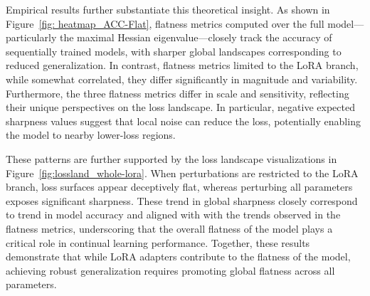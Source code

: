 \documentclass[letterpaper]{article} %
\begin{document}
Empirical results further substantiate this theoretical insight. As shown in Figure~\ref{fig: heatmap_ACC-Flat}, flatness metrics computed over the full model—particularly the maximal Hessian eigenvalue—closely track the accuracy of sequentially trained models, with sharper global landscapes corresponding to reduced generalization. In contrast, flatness metrics limited to the LoRA branch, while somewhat correlated, they differ significantly in magnitude and variability.  Furthermore, the three flatness metrics differ in scale and sensitivity, reflecting their unique perspectives on the loss landscape. In particular, negative expected sharpness values suggest that local noise can reduce the loss, potentially enabling the model to nearby lower-loss regions.





These patterns are further supported by the loss landscape visualizations in Figure~\ref{fig:lossland_whole-lora}. When perturbations are restricted to the LoRA branch, loss surfaces appear deceptively flat, whereas perturbing all parameters exposes significant sharpness. These trend in global sharpness closely correspond to trend in model accuracy and aligned with with the trends observed in the flatness metrics,  underscoring that the overall flatness of the model plays a critical role in continual learning performance. Together, these results demonstrate that while LoRA adapters contribute to the flatness of the model, achieving robust generalization requires promoting global flatness across all parameters.
\end{document}
